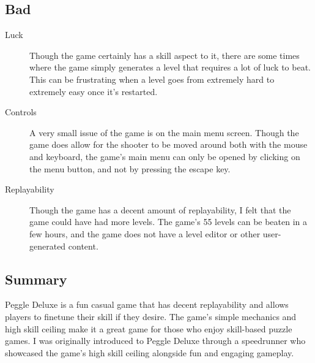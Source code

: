 \documentclass{article}
\begin{document}
\subsection{Bad}
\begin{description}
      \item[Luck] Though the game certainly has a skill aspect to it, there are
            some times where the game simply generates a level that requires a lot of
            luck to beat. This can be frustrating when a level goes from extremely
            hard to extremely easy once it's restarted.
      \item[Controls] A very small issue of the game is on the main menu screen.
            Though the game does allow for the shooter to be moved around both with
            the mouse and keyboard, the game's main menu can only be opened by
            clicking on the menu button, and not by pressing the escape key.
      \item[Replayability] Though the game has a decent amount of replayability,
            I felt that the game could have had more levels. The game's 55 levels can
            be beaten in a few hours, and the game does not have a level editor or
            other user-generated content.
\end{description}

\subsection{Summary}
Peggle Deluxe is a fun casual game that has decent replayability and allows
players to finetune their skill if they desire. The game's simple mechanics and
high skill ceiling make it a great game for those who enjoy skill-based puzzle
games. I was originally introduced to Peggle Deluxe through a speedrunner who
showcased the game's high skill ceiling alongside fun and engaging gameplay.
\end{document}
